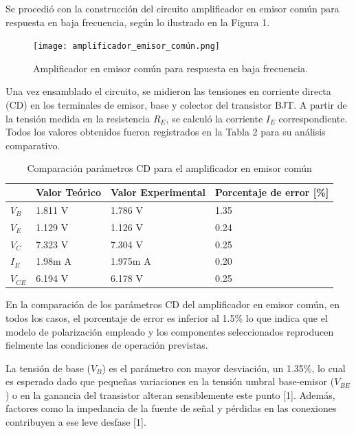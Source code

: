 \documentclass[journal]{IEEEtran}
\begin{document}
\par Se procedió con la construcción del circuito amplificador en emisor común para respuesta en baja frecuencia, según lo ilustrado en la Figura 1. 
\begin{figure}[H]
    \centering
    \texttt{[image: amplificador\_emisor\_común.png]}
    \caption{Amplificador en emisor común para respuesta en baja frecuencia.}
    \label{fig:amplificador_emisor_común.}
\end{figure}
\par Una vez ensamblado el circuito, se midieron las tensiones en corriente directa (CD) en los terminales de emisor, base y colector del transistor BJT. A partir de la tensión medida en la resistencia \( R_E \), se calculó la corriente \( I_E \) correspondiente. Todos los valores obtenidos fueron registrados en la Tabla 2 para su análisis comparativo.
\begin{table}[h]
    \caption{Comparación parámetros CD para el amplificador en emisor común}
    \centering
    \renewcommand{\arraystretch}{1.2} %
    \begin{tabular}{|l|p{2cm}|p{2cm}|p{2cm}|}
        \hline
        & \textbf{Valor Teórico} & \textbf{Valor Experimental} & \textbf{Porcentaje de error [\%]} \\
        \hline
        \( V_B \) & 1.811 V  & 1.786 V  & 1.35 \\
        \hline
        \( V_E \) & 1.129 V   & 1.126 V  & 0.24 \\
        \hline
        \( V_C \) & 7.323 V & 7.304 V & 0.25 \\
        \hline
        \( I_E \) & 1.98m A & 1.975m A & 0.20 \\
        \hline
        \( V_{CE} \) & 6.194 V & 6.178 V & 0.25 \\
        \hline
    \end{tabular}
    \label{tab:parámetrosCD}
\end{table}
\par En la comparación de los parámetros CD del amplificador en emisor común, en todos los casos, el porcentaje de error es inferior al 1.5\% lo que indica que el modelo de polarización empleado y los componentes seleccionados reproducen fielmente las condiciones de operación previstas.
\par La tensión de base (\( V_B \)) es el parámetro con mayor desviación, un 1.35\%, lo cual es esperado dado que pequeñas variaciones en la tensión umbral base-emisor (\( V_{BE} \)) o en la ganancia del transistor alteran sensiblemente este punto [1]. Además, factores como la impedancia de la fuente de señal y pérdidas en las conexiones contribuyen a ese leve desfase [1].
\end{document}
